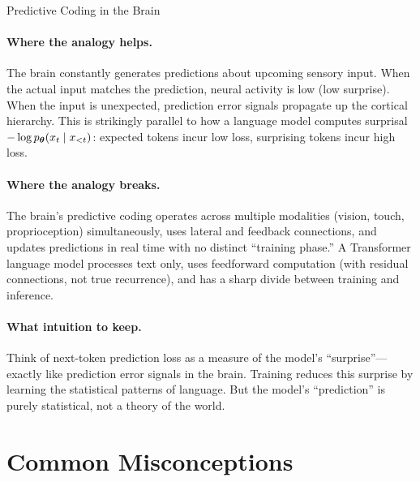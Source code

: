 \begin{analogybox}{Predictive Coding in the Brain}
  \paragraph{Where the analogy helps.}
  The brain constantly generates predictions about upcoming sensory input. When the actual input matches the prediction, neural activity is low (low surprise). When the input is unexpected, prediction error signals propagate up the cortical hierarchy. This is strikingly parallel to how a language model computes surprisal $-\log p_{\boldsymbol{\theta}}(x_t \mid x_{<t})$: expected tokens incur low loss, surprising tokens incur high loss.

  \paragraph{Where the analogy breaks.}
  The brain's predictive coding operates across multiple modalities (vision, touch, proprioception) simultaneously, uses lateral and feedback connections, and updates predictions in real time with no distinct ``training phase.'' A Transformer language model processes text only, uses feedforward computation (with residual connections, not true recurrence), and has a sharp divide between training and inference.

  \paragraph{What intuition to keep.}
  Think of next-token prediction loss as a measure of the model's ``surprise''---exactly like prediction error signals in the brain. Training reduces this surprise by learning the statistical patterns of language. But the model's ``prediction'' is purely statistical, not a theory of the world.
\end{analogybox}


\section{Common Misconceptions}
\label{ch:01:sec:misconceptions}

